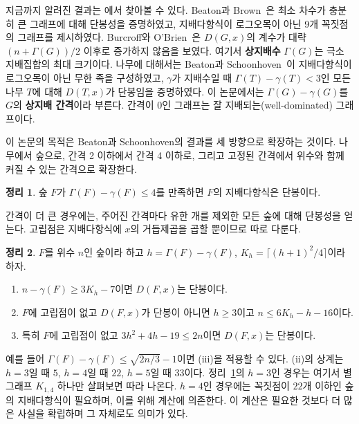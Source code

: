\documentclass[11pt,a4paper]{article}
\theoremstyle{definition}
\newtheorem{theorem}{정리}[section]
\begin{document}
지금까지 알려진 결과는 \cite{BB22,BO,BS,DHP,GZ,Omar}에서 찾아볼 수 있다. Beaton과
Brown~\cite{BB22}은 최소 차수가 충분히 큰 그래프에 대해 단봉성을 증명하였고,
지배다항식이 로그오목이 아닌 9개 꼭짓점의 그래프를 제시하였다. Burcroff와
O'Brien~\cite{BO}은 $D(G,x)$의 계수가 대략 $(n+\Gamma(G))/2$ 이후로 증가하지 않음을
보였다. 여기서 \textbf{상지배수} $\Gamma(G)$는 극소 지배집합의 최대 크기이다. 나무에
대해서는 Beaton과 Schoonhoven~\cite{BS}이 지배다항식이 로그오목이 아닌 무한 족을
구성하였고, $\gamma$가 지배수일 때 $\Gamma(T)-\gamma(T)<3$인 모든 나무 $T$에 대해
$D(T,x)$가 단봉임을 증명하였다. 이 논문에서는 $\Gamma(G)-\gamma(G)$를 $G$의
\textbf{상지배 간격}이라 부른다. 간격이 0인 그래프는 잘 지배되는(well-dominated)
그래프이다.

이 논문의 목적은 Beaton과 Schoonhoven의 결과를 세 방향으로 확장하는 것이다. 나무에서
숲으로, 간격 2 이하에서 간격 4 이하로, 그리고 고정된 간격에서 위수와 함께 커질 수
있는 간격으로 확장한다.

\begin{theorem}\label{thm:gapfour-intro}
숲 $F$가 $\Gamma(F)-\gamma(F)\le 4$를 만족하면 $F$의 지배다항식은 단봉이다.
\end{theorem}

간격이 더 큰 경우에는, 주어진 간격마다 유한 개를 제외한 모든 숲에 대해 단봉성을
얻는다. 고립점은 지배다항식에 $x$의 거듭제곱을 곱할 뿐이므로 따로 다룬다.

\begin{theorem}\label{thm:criterion-intro}
$F$를 위수 $n$인 숲이라 하고 $h=\Gamma(F)-\gamma(F)$,
$K_h=\lceil (h+1)^2/4\rceil$이라 하자.
\begin{enumerate}
\item[\textup{(i)}] $n-\gamma(F)\ge 3K_h-7$이면 $D(F,x)$는 단봉이다.
\item[\textup{(ii)}] $F$에 고립점이 없고 $D(F,x)$가 단봉이 아니면 $h\ge 3$이고
$n\le 6K_h-h-16$이다.
\item[\textup{(iii)}] 특히 $F$에 고립점이 없고 $3h^2+4h-19\le 2n$이면 $D(F,x)$는
단봉이다.
\end{enumerate}
\end{theorem}

예를 들어 $\Gamma(F)-\gamma(F)\le\sqrt{2n/3}-1$이면 (iii)을 적용할 수 있다. (ii)의
상계는 $h=3$일 때 $5$, $h=4$일 때 $22$, $h=5$일 때 $33$이다. 정리~\ref{thm:gapfour-intro}의
$h=3$인 경우는 여기서 별 그래프 $K_{1,4}$ 하나만 살펴보면 따라 나온다. $h=4$인
경우에는 꼭짓점이 $22$개 이하인 숲의 지배다항식이 필요하며, 이를 위해 계산에
의존한다. 이 계산은 필요한 것보다 더 많은 사실을 확립하며 그 자체로도 의미가 있다.
\end{document}
